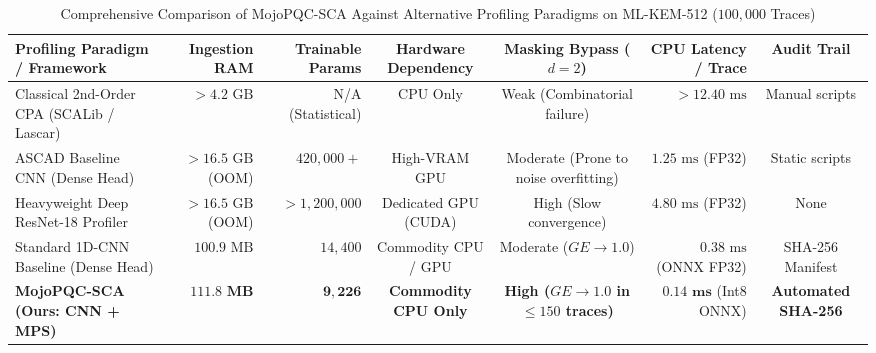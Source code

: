 \documentclass[letterpaper]{article}
\begin{document}
\begin{table}[htbp]
\centering
\caption{Comprehensive Comparison of MojoPQC-SCA Against Alternative Profiling Paradigms on ML-KEM-512 ($100,000$ Traces)}
\label{tab:alternative_comparison}
\begin{adjustbox}{max width=\textwidth}
\begin{tabular}{|l|r|r|c|c|r|c|}
\hline
\textbf{Profiling Paradigm / Framework} & \textbf{Ingestion RAM} & \textbf{Trainable Params} & \textbf{Hardware Dependency} & \textbf{Masking Bypass ($d=2$)} & \textbf{CPU Latency / Trace} & \textbf{Audit Trail} \\ 
\hline
Classical 2nd-Order CPA (SCALib / Lascar) & $>4.2\text{ GB}$ & N/A (Statistical) & CPU Only & Weak (Combinatorial failure) & $>12.40\text{ ms}$ & Manual scripts \\
ASCAD Baseline CNN (Dense Head) & $>16.5\text{ GB}$ (OOM) & $420,000+$ & High-VRAM GPU & Moderate (Prone to noise overfitting) & $1.25\text{ ms}$ (FP32) & Static scripts \\
Heavyweight Deep ResNet-18 Profiler & $>16.5\text{ GB}$ (OOM) & $>1,200,000$ & Dedicated GPU (CUDA) & High (Slow convergence) & $4.80\text{ ms}$ (FP32) & None \\
Standard 1D-CNN Baseline (Dense Head) & $100.9\text{ MB}$ & $14,400$ & Commodity CPU / GPU & Moderate ($GE \to 1.0$) & $0.38\text{ ms}$ (ONNX FP32) & SHA-256 Manifest \\
\hline
\textbf{MojoPQC-SCA (Ours: CNN + MPS)} & $\mathbf{111.8\text{ MB}}$ & $\mathbf{9,226}$ & \textbf{Commodity CPU Only} & \textbf{High ($GE \to 1.0$ in $\le 150$ traces)} & $\mathbf{0.14\text{ ms}}$ (Int8 ONNX) & \textbf{Automated SHA-256} \\
\hline
\end{tabular}
\end{adjustbox}
\end{table}
\end{document}
